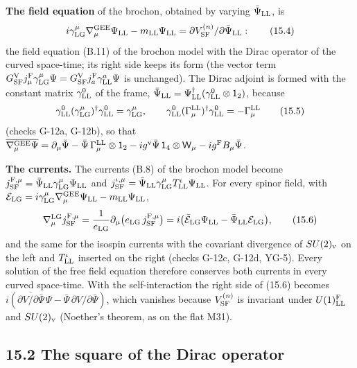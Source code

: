 \documentclass[
  10pt,
]{article}
\begin{document}
\textbf{The field equation} of the brochon, obtained by varying
\(\bar\Psi_{\rm LL}\), is
\[i\gamma^\mu_{\rm LG}\nabla^{\rm GEE}_\mu\Psi_{\rm LL}-m_{\rm LL}\Psi_{\rm LL}=\partial V^{(n)}_{\rm SF}/\partial\bar\Psi_{\rm LL}:\tag{15.4}\]
the field equation (B.11) of the brochon model with the Dirac operator
of the curved space-time; its right side keeps its form (the vector term
\(G^{\rm V}_{\rm SF}j^{\rm F}_\mu\gamma^\mu_{\rm LG}\Psi=G^{\rm V}_{\rm SF}j^{\rm F}_a\gamma^a_{\rm LL}\Psi\)
is unchanged). The Dirac adjoint is formed with the constant matrix
\(\gamma^0_{\rm LL}\) of the frame,
\(\bar\Psi_{\rm LL}=\Psi^\dagger_{\rm LL}(\gamma^0_{\rm LL}\otimes\mathsf 1_2)\),
because
\[\gamma^0_{\rm LL}(\gamma^\mu_{\rm LG})^\dagger\gamma^0_{\rm LL}=\gamma^\mu_{\rm LG},\qquad\gamma^0_{\rm LL}(\Gamma^{\rm LL}_\mu)^\dagger\gamma^0_{\rm LL}=-\Gamma^{\rm LL}_\mu\tag{15.5}\]
(checks G-12a, G-12b), so that
\(\overline{\nabla^{\rm GEE}_\mu\Psi}=\partial_\mu\bar\Psi-\bar\Psi\,\Gamma^{\rm LL}_\mu\otimes\mathsf 1_2-ig^{\rm v}\bar\Psi\,\mathsf 1_4\otimes\mathsf W_\mu-ig^{\rm F}B_\mu\bar\Psi\).

\textbf{The currents.} The currents (B.8) of the brochon model become
\(j^{{\rm F},\mu}_{\rm SF}=\bar\Psi_{\rm LL}\gamma^\mu_{\rm LG}\Psi_{\rm LL}\)
and
\(j^{\iota,\mu}_{\rm SF}=\bar\Psi_{\rm LL}\gamma^\mu_{\rm LG}T^\iota_{\rm LL}\Psi_{\rm LL}\).
For every spinor field, with
\(\mathcal E_{\rm LG}=i\gamma^\mu_{\rm LG}\nabla^{\rm GEE}_\mu\Psi_{\rm LL}-m_{\rm LL}\Psi_{\rm LL}\),
\[\nabla^{\rm LG}_\mu j^{{\rm F},\mu}_{\rm SF}=\frac1{e_{\rm LG}}\partial_\mu\big(e_{\rm LG}\,j^{{\rm F},\mu}_{\rm SF}\big)=i\big(\bar{\mathcal E}_{\rm LG}\Psi_{\rm LL}-\bar\Psi_{\rm LL}\mathcal E_{\rm LG}\big),\tag{15.6}\]
and the same for the isospin currents with the covariant divergence of
\(SU(2)_{\rm v}\) on the left and \(T^\iota_{\rm LL}\) inserted on the
right (checks G-12c, G-12d, YG-5). Every solution of the free field
equation therefore conserves both currents in every curved space-time.
With the self-interaction the right side of (15.6) becomes
\(i(\overline{\partial V/\partial\bar\Psi}\,\Psi-\bar\Psi\,\partial V/\partial\bar\Psi)\),
which vanishes because \(V^{(n)}_{\rm SF}\) is invariant under
\(U(1)^{\rm F}_{\rm LL}\) and \(SU(2)_{\rm v}\) (Noether's theorem, as
on the flat M31).

\hypertarget{the-square-of-the-dirac-operator}{%
\subsection{15.2 The square of the Dirac
operator}\label{the-square-of-the-dirac-operator}}
\end{document}
